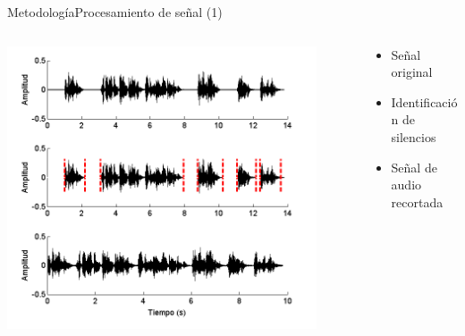 \documentclass[10pt]{beamer}
\begin{document}
\begin{frame}{Metodología}{Procesamiento de señal (1)}
\small {
\vspace{0mm} 
\begin{columns}   
  \begin{column}{0.6\textwidth} 
    \hfill  
    \includegraphics[width=0.9\textwidth]{gfx/filename51}    
  \end{column}
  \begin{column}{0.4\textwidth}
    \vspace{-8mm} 
    \begin{itemize}
      \setlength{\itemindent}{-2em}      
      \itemsep 4.6em    
      \item Señal original
      \item Identificación de silencios
      \item Señal de audio recortada
    \end{itemize}
  \end{column}   
\end{columns}   
}
\end{frame}
\end{document}
